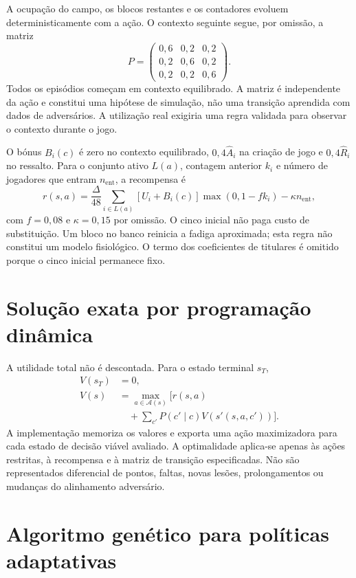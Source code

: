 A ocupação do campo, os blocos restantes e os contadores evoluem
deterministicamente com a ação. O contexto seguinte segue, por omissão,
a matriz
\[
P=\begin{pmatrix}
0{,}6&0{,}2&0{,}2\\
0{,}2&0{,}6&0{,}2\\
0{,}2&0{,}2&0{,}6
\end{pmatrix}.
\]
Todos os episódios começam em contexto equilibrado. A matriz é independente
da ação e constitui uma hipótese de simulação, não uma transição aprendida
com dados de adversários. A utilização real exigiria uma regra validada
para observar o contexto durante o jogo.

O bónus \(B_i(c)\) é zero no contexto equilibrado, \(0{,}4\widehat{A}_i\)
na criação de jogo e \(0{,}4\widehat{R}_i\) no ressalto. Para o conjunto
ativo \(L(a)\), contagem anterior \(k_i\) e número de jogadores que entram
\(n_{\mathrm{ent}}\), a recompensa é
\[
r(s,a)=\frac{\Delta}{48}\sum_{i\in L(a)}
[U_i+B_i(c)]\max(0,1-fk_i)-\kappa n_{\mathrm{ent}},
\]
com \(f=0{,}08\) e \(\kappa=0{,}15\) por omissão. O cinco inicial não paga
custo de substituição. Um bloco no banco reinicia a fadiga aproximada;
esta regra não constitui um modelo fisiológico. O termo dos coeficientes
de titulares é omitido porque o cinco inicial permanece fixo.

\section{Solução exata por programação dinâmica}

A utilidade total não é descontada. Para o estado terminal \(s_T\),
\[
\begin{aligned}
V(s_T)&=0,\\
V(s)&=\max_{a\in\mathcal{A}(s)}\biggl[r(s,a)\\
&\quad+\sum_{c'}P(c'\mid c)V(s'(s,a,c'))\biggr].
\end{aligned}
\]
A implementação memoriza os valores e exporta uma ação maximizadora para
cada estado de decisão viável avaliado. A optimalidade aplica-se apenas
às ações restritas, à recompensa e à matriz de transição especificadas.
Não são representados diferencial de pontos, faltas, novas lesões,
prolongamentos ou mudanças do alinhamento adversário.

\section{Algoritmo genético para políticas adaptativas}

